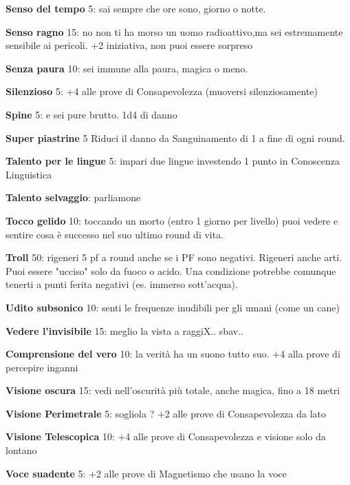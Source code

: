 \documentclass[a4paper,11pt,twoside,openany]{book}
\begin{document}
\textbf{Senso del tempo} 5: sai sempre che ore sono, giorno o notte.

\textbf{Senso ragno} 15: no non ti ha morso un uomo radioattivo,ma sei estremamente sensibile ai pericoli. +2 iniziativa, non puoi essere sorpreso

\textbf{Senza paura} 10: sei immune alla paura, magica o meno.

\textbf{Silenzioso} 5: +4 alle prove di Consapevolezza (muoversi silenziosamente)

\textbf{Spine} 5: e sei pure brutto. 1d4 di danno

\textbf{Super piastrine} 5 Riduci il danno da Sanguinamento di 1 a fine di ogni round.

\textbf{Talento per le lingue} 5: impari due lingue investendo 1 punto in Conoscenza Linguistica

\textbf{Talento selvaggio}: parliamone

\textbf{Tocco gelido} 10: toccando un morto (entro 1 giorno per livello) puoi vedere e sentire cosa è successo nel suo ultimo round di vita.

\textbf{Troll} 50: rigeneri 5 pf a round anche se i PF sono negativi. Rigeneri anche arti. Puoi essere "ucciso" solo da fuoco o acido. Una condizione potrebbe comunque tenerti a punti ferita negativi (es. immerso sott'acqua).

\textbf{Udito subsonico} 10: senti le frequenze inudibili per gli umani (come un cane)

\textbf{Vedere l'invisibile} 15: meglio la vista a raggiX.. sbav..

\textbf{Comprensione del vero} 10: la verità ha un suono tutto suo. +4 alla prove di percepire inganni

\textbf{Visione oscura} 15: vedi nell'oscurità più totale, anche magica, fino a 18 metri

\textbf{Visione Perimetrale} 5: sogliola ? +2 alle prove di Consapevolezza da lato

\textbf{Visione Telescopica} 10: +4 alle prove di Consapevolezza e visione solo da lontano

\textbf{Voce suadente} 5: +2 alle prove di Magnetismo che usano la voce
\end{document}
